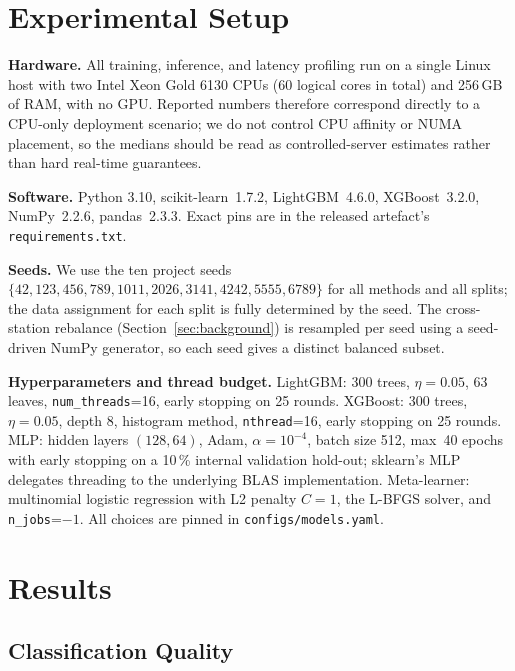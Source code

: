 \documentclass[conference]{IEEEtran}
\begin{document}
\section{Experimental Setup}
\label{sec:setup}

\textbf{Hardware.} All training, inference, and latency profiling run on
a single Linux host with two Intel Xeon Gold 6130 CPUs (60 logical
cores in total) and 256\,GB of RAM, with no GPU. Reported numbers
therefore correspond directly to a CPU-only deployment scenario; we do
not control CPU affinity or NUMA placement, so the medians should be
read as controlled-server estimates rather than hard real-time
guarantees.

\textbf{Software.} Python 3.10, scikit-learn~1.7.2, LightGBM~4.6.0,
XGBoost~3.2.0, NumPy~2.2.6, pandas~2.3.3. Exact pins are in the
released artefact's \texttt{requirements.txt}.

\textbf{Seeds.} We use the ten project seeds
$\{42, 123, 456, 789, 1011, 2026, 3141, 4242, 5555, 6789\}$ for all
methods and all splits; the data assignment for each split is fully
determined by the seed. The cross-station rebalance (Section~\ref{sec:background})
is resampled per seed using a seed-driven NumPy generator, so each seed
gives a distinct balanced subset.

\textbf{Hyperparameters and thread budget.} LightGBM: 300 trees,
$\eta=0.05$, 63 leaves, \texttt{num\_threads}=16, early stopping on 25
rounds. XGBoost: 300 trees, $\eta=0.05$, depth 8, histogram method,
\texttt{nthread}=16, early stopping on 25 rounds. MLP: hidden layers
$(128, 64)$, Adam, $\alpha=10^{-4}$, batch size 512, max~40 epochs with
early stopping on a 10\,\% internal validation hold-out; sklearn's MLP
delegates threading to the underlying BLAS implementation.
Meta-learner: multinomial logistic regression with L2 penalty $C=1$,
the L-BFGS solver, and \texttt{n\_jobs}=$-1$. All choices are pinned in
\texttt{configs/models.yaml}.

\section{Results}
\label{sec:results}

\subsection{Classification Quality}
\end{document}

